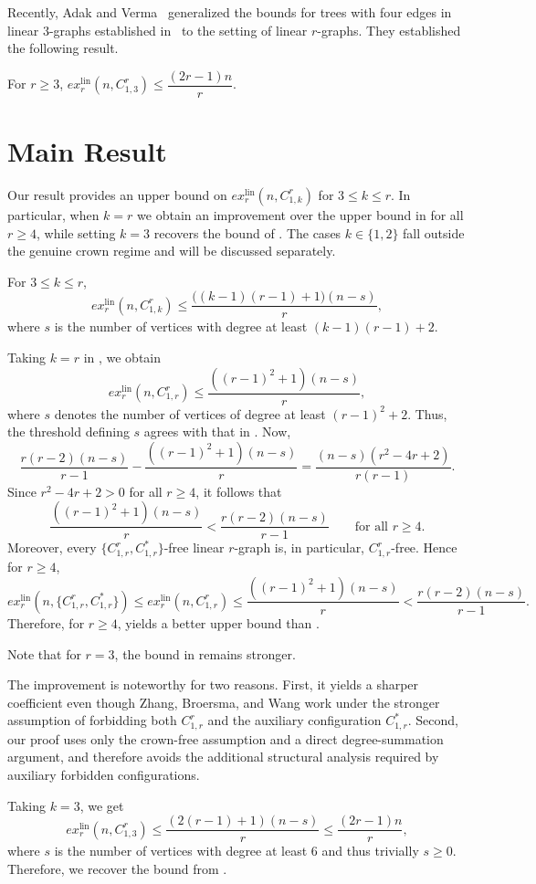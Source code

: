 \documentclass[12pt]{article}
\begin{document}
Recently, Adak and Verma~\cite{adak2026bounds} generalized the bounds for trees with four edges in linear $3$-graphs established in~\cite{gyarfas2022linear} to the setting of linear $r$-graphs. They established the following result.
\begin{theorem}\label{thm4} For $r \geq 3$, $ex_r^{\mathrm{lin}}(n,C^r_{1,3}) \leq \dfrac{(2r-1)n}{r}$.
\end{theorem}
\section{Main Result}
Our result provides an upper bound on $ex_r^{\mathrm{lin}}(n, C^r_{1,k})$ for $3 \le k \le r$. In particular, when $k = r$ we obtain an improvement over the upper bound in  for all $r \geq 4$, while setting $k = 3$ recovers the bound of . 
The cases $k\in \{1,2\}$ fall outside the genuine crown regime and will be discussed separately.
\begin{theorem}\label{main}
    For $3\leq k \leq r$,
    $$ex_r^{\mathrm{lin}}(n,C^r_{1,k}) \leq \frac{\big((k-1)(r-1)+1\big)(n-s)}{r},$$
    where $s$ is the number of vertices with degree at least $(k-1)(r-1) +2$. 
\end{theorem}

\begin{remark}
Taking $k=r$ in , we obtain
$$ex_r^{\mathrm{lin}}(n,C_{1,r}^r)
\le \frac{((r-1)^2+1)(n-s)}{r},$$
where $s$ denotes the number of vertices of degree at least $(r-1)^2+2$. Thus, the threshold defining $s$ agrees with that in . Now,
$$
\frac{r(r-2)(n-s)}{r-1}-
\frac{((r-1)^2+1)(n-s)}{r}=
\frac{(n-s)(r^2-4r+2)}{r(r-1)}.
$$
Since $r^2-4r+2>0$ for all $r\ge 4$, it follows that
$$
\frac{((r-1)^2+1)(n-s)}{r}<
\frac{r(r-2)(n-s)}{r-1}\qquad \text{for all } r\ge 4.
$$
Moreover, every $\{C_{1,r}^r,C_{1,r}^*\}$-free linear $r$-graph is, in particular, $C_{1,r}^r$-free. Hence for $r \geq 4$,
$$
ex_r^{\mathrm{lin}}(n,\{C_{1,r}^r,C_{1,r}^*\})
\le
ex_r^{\mathrm{lin}}(n,C_{1,r}^r)
\le
\frac{((r-1)^2+1)(n-s)}{r}
<
\frac{r(r-2)(n-s)}{r-1}.
$$
Therefore, for $r\ge 4$,  yields a better upper bound than .

Note that for $r=3$, the bound in  remains stronger.
\end{remark}
The improvement is noteworthy for two reasons. First, it yields a sharper coefficient even though Zhang, Broersma, and Wang work under the stronger assumption of forbidding both $C_{1,r}^r$ and the auxiliary configuration $C_{1,r}^*$. Second, our proof uses only the crown-free assumption and a direct degree-summation argument, and therefore avoids the additional structural analysis required by auxiliary forbidden configurations.
\begin{remark}
    Taking $k =3$, we get
    $$ex_r^{\mathrm{lin}}(n,C_{1,3}^r) \leq \frac{(2(r-1)+1)(n-s)}{r} \leq \frac{(2r-1)n}{r},$$
    where $s$ is the number of vertices with degree at least $6$ and thus trivially $s \geq 0$. Therefore, we recover the bound from .
\end{remark}
\end{document}
